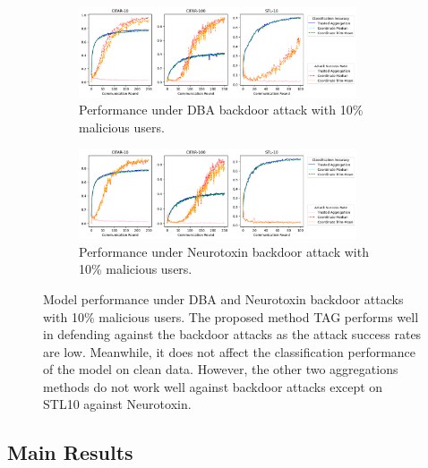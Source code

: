 \documentclass{article} %
\begin{document}
\begin{figure}
\vspace{-10pt}
  \begin{subfigure}{\textwidth}
    \includegraphics[width=0.9\textwidth]{make_article/make_visuals/visuals/accuracy--n_malicious1--dba0--beta0.2.png}
    \caption{\footnotesize Performance under DBA backdoor attack with 10\% malicious users.}
  \end{subfigure}%

  \begin{subfigure}{\textwidth}
    \includegraphics[width=0.9\textwidth]{make_article/make_visuals/visuals/accuracy--n_malicious1--dba0--beta0.2--neuro_p0.1.png}
    \caption{\footnotesize Performance under Neurotoxin backdoor attack with 10\% malicious users.}
  \end{subfigure}%
 \vspace{-5pt}
\caption{\footnotesize Model performance under DBA and Neurotoxin backdoor attacks with 10\% malicious users. The proposed method TAG performs well in defending against the backdoor attacks as the attack success rates are low. Meanwhile, it does not affect the classification performance of the model on clean data. However, the other two aggregations methods do not work well against backdoor attacks except on STL10 against Neurotoxin.} 
\label{fig: accuracy--n_malicious1}
\vspace{-10pt}
\end{figure}

\vspace{-10pt}
\subsection{Main Results}
\vspace{-10pt}
\end{document}
